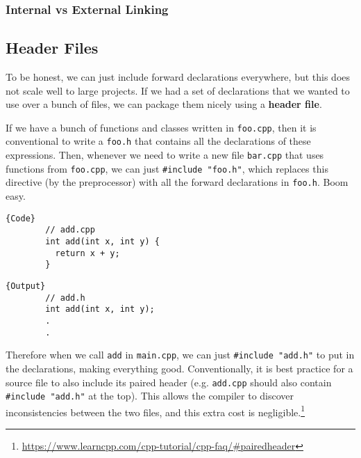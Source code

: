 \documentclass{article}
\begin{document}
    \subsubsection{Internal vs External Linking}
  
  \subsection{Header Files} 

    To be honest, we can just include forward declarations everywhere, but this does not scale well to large projects. If we had a set of declarations that we wanted to use over a bunch of files, we can package them nicely using a \textbf{header file}. 
    
    If we have a bunch of functions and classes written in \texttt{foo.cpp}, then it is conventional to write a \texttt{foo.h} that contains all the declarations of these expressions. Then, whenever we need to write a new file \texttt{bar.cpp} that uses functions from \texttt{foo.cpp}, we can just \texttt{\#include "foo.h"}, which replaces this directive (by the preprocessor) with all the forward declarations in \texttt{foo.h}. Boom easy. 

    \noindent\begin{minipage}{.5\textwidth}
      \begin{lstlisting}[]{Code}
        // add.cpp
        int add(int x, int y) { 
          return x + y;
        }
      \end{lstlisting}
      \end{minipage}
      \hfill
      \begin{minipage}{.49\textwidth}
      \begin{lstlisting}[]{Output}
        // add.h 
        int add(int x, int y); 
        .
        .
      \end{lstlisting}
    \end{minipage}

    Therefore when we call \texttt{add} in \texttt{main.cpp}, we can just \texttt{\#include "add.h"} to put in the declarations, making everything good. Conventionally, it is best practice for a source file to also include its paired header (e.g. \texttt{add.cpp} should also contain \texttt{\#include "add.h"} at the top). This allows the compiler to discover inconsistencies between the two files, and this extra cost is negligible.\footnote{\href{here}{https://www.learncpp.com/cpp-tutorial/cpp-faq/\#pairedheader}} 
\end{document}
